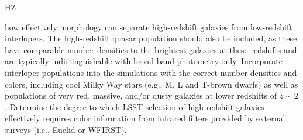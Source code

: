 {\begin{tasklist}{HZ}
\begin{task}
{how effectively morphology can separate high-redshift galaxies from low-redshift interlopers.
The high-redshift quasar population should also be included, as these have comparable number densities to the brightest galaxies at these redshifts and are typically indistinguishable with broad-band photometry only.
Incorporate interloper populations into the simulations with the correct number densities and colors, including cool Milky Way stars
(e.g., M, L and T-brown dwarfs) as well as populations of very red, massive,
and/or dusty galaxies at lower redshifts of $z\sim2$.
Determine the degree to which LSST selection of high-redshift galaxies effectively requires 
color information from infrared filters provided by external surveys
(i.e., Euclid or WFIRST). 
 }
 ~\\
\end{task}
\end{tasklist}
}

